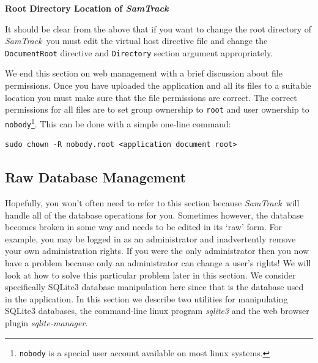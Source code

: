\documentclass[12pt,twoside]{article}
\newcommand{\samtrack}{\emph{SamTrack}}
\begin{document}
\begin{plainblock}
\begin{center}
\bfseries Root Directory Location of \samtrack
\end{center}
It should be clear from the above that if you want to change the root
directory of \samtrack\  you must edit the
virtual host directive file and change the \verb=DocumentRoot= directive
and \verb=Directory= section argument appropriately.
\end{plainblock}

We end this section on web management with a brief discussion about
file permissions. Once you have uploaded the application and all its
files to a suitable location you must make sure that the file permissions
are correct. The correct permissions for all files are to set group
ownership to \verb=root= and user ownership to \verb=nobody=\footnote{%
\texttt{nobody} is a special user account available on most linux
systems.}. This can be done with a simple one-line command:
\begin{verbatim}
sudo chown -R nobody.root <application document root>
\end{verbatim}

\subsection{Raw Database Management}
Hopefully, you won't often need to refer to this section because
\samtrack\  will handle all of the database operations
for you. Sometimes however, the database becomes broken in some way
and needs to be edited in its `raw' form. For example, you may
be logged in as an administrator and inadvertently remove your own
administration rights. If you were the only administrator then you now
have a problem because only an administrator can change a user's rights!
We will look at how to solve this particular problem later in this
section. We consider specifically SQLite3 database manipulation here
since that is the database used in the application.
In this section we describe two utilities for manipulating
SQLite3 databases, the command-line linux program \emph{sqlite3} and
the web browser plugin \emph{sqlite-manager}\cite{sqlitemanager}.
\end{document}
